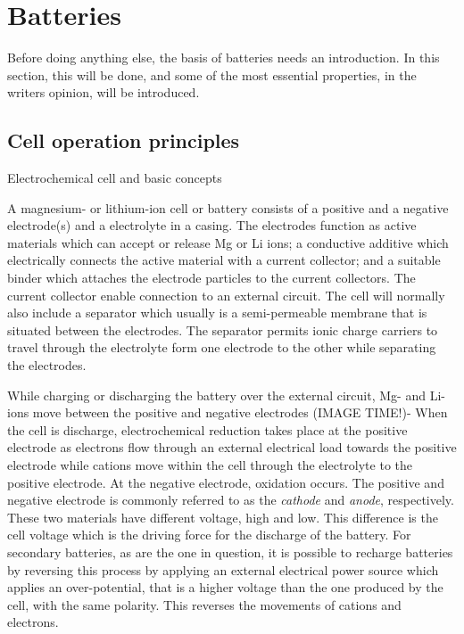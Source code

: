 \newcommand{\colVec}[1]{\begin{bmatrix} #1_0 \\ #1_1 \\ \vdots \\ #1_{n-1} \\ #1_{n} \end{bmatrix}}

\section{Batteries}
Before doing anything else, the basis of batteries needs an introduction. In this section, this will be done, and some of the most essential properties, in the writers opinion, will be introduced. 

\subsection{Cell operation principles}
Electrochemical cell and basic concepts

	A magnesium- or lithium-ion cell or battery consists of a positive and a negative electrode(s) and a electrolyte in a casing. The electrodes function as active materials which can accept or release Mg or Li ions; a conductive additive which electrically connects the active material with a current collector; and a suitable binder which attaches the electrode particles to the current collectors. The current collector enable connection to an external circuit. The cell will normally also include a separator which usually is a semi-permeable membrane that is situated between the electrodes. The separator permits ionic charge carriers to travel through the electrolyte form one electrode to the other while separating the electrodes.  

	While charging or discharging the battery over the external circuit, Mg- and Li- ions move between the positive and negative electrodes (IMAGE TIME!)- When the cell is discharge, electrochemical reduction takes place at the positive electrode as electrons flow through an external electrical load towards the positive electrode while cations move within the cell through the electrolyte to the positive electrode. At the negative electrode, oxidation occurs. The positive and negative electrode is commonly referred to as the \textit{cathode} and \textit{anode}, respectively. These two materials have different voltage, high and low. This difference is the cell voltage which is the driving force for the discharge of the battery. For secondary batteries, as are the one in question, it is possible to recharge batteries by reversing this process by applying an external electrical power source which applies an over-potential, that is a higher voltage than the one produced by the cell, with the same polarity. This reverses the movements of cations and electrons. 
	
